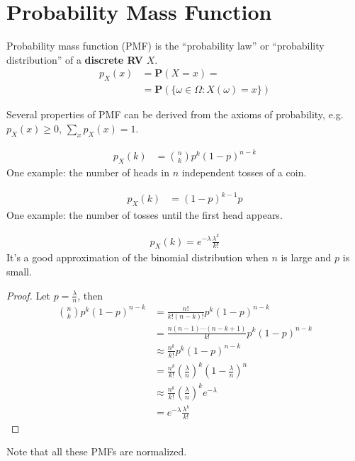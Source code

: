 \section{Probability Mass Function}
\begin{definition}
    Probability mass function (PMF) is the ``probability law'' or ``probability distribution'' of a \textbf{discrete RV} $X$.
    \begin{align}
        p_{X}(x) &= \mathbf{P}(X = x) = \\ 
                 &= \mathbf{P}(\{\omega \in \varOmega: X(\omega) = x\})
    \end{align}
\end{definition}
Several properties of PMF can be derived from the axioms of probability, e.g. $p_{X}(x) \geq 0$, $\sum_{x} p_{X}(x) = 1$.
\begin{example}
    \begin{align}
        p_{X}(k) &= \binom{n}{k} p^{k} (1-p)^{n-k}
    \end{align}
    One example: the number of heads in $n$ independent tosses of a coin.
\end{example}
\begin{example}
    \begin{align}
        p_{X}(k) &= (1-p)^{k-1} p
    \end{align}
    One example: the number of tosses until the first head appears.
\end{example}
\begin{example}
    \begin{align}
        p_{X}(k) = e^{-\lambda} \frac{\lambda^{k}}{k!}
    \end{align}
    It's a good approximation of the binomial distribution when $n$ is large and $p$ is small.
    \begin{proof}
        Let $p = \frac{\lambda}{n}$, then
        \begin{align}
            \binom{n}{k} p^{k} (1-p)^{n-k} &= \frac{n!}{k!(n-k)!} p^{k} (1-p)^{n-k} \\
            &= \frac{n(n-1)\cdots(n-k+1)}{k!} p^{k} (1-p)^{n-k} \\
            &\approx \frac{n^{k}}{k!} p^{k} (1-p)^{n-k} \\
            &= \frac{n^{k}}{k!} \left(\frac{\lambda}{n}\right)^{k} \left(1-\frac{\lambda}{n}\right)^{n} \\
            &\approx \frac{n^{k}}{k!} \left(\frac{\lambda}{n}\right)^{k} e^{-\lambda} \\
            &= e^{-\lambda} \frac{\lambda^{k}}{k!}
        \end{align}
    \end{proof}
\end{example}
Note that all these PMFs are normalized.

